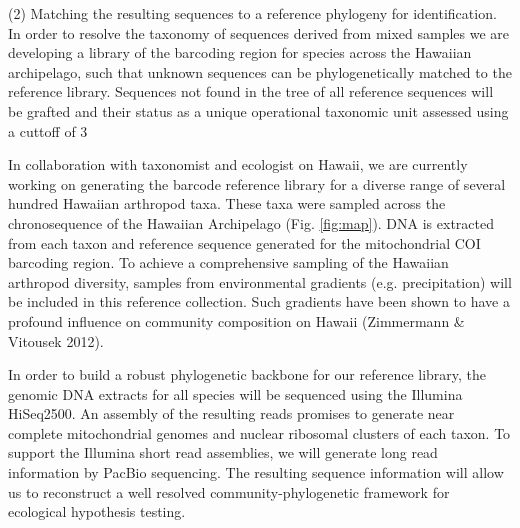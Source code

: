 \documentclass[11pt]{article}
\makeatletter
\renewcommand{\paragraph}{\@startsection{paragraph}{4}{\z@}
  {1ex \@plus 1ex \@minus .2ex}{-1em}
  {\normalfont\normalsize\it}
}
\makeatother
\begin{document}
\paragraph{(2) Matching the resulting sequences to a reference phylogeny for identification.}
In order to resolve the taxonomy of sequences derived from mixed samples we are developing a library of the barcoding region for species across the Hawaiian archipelago, such that unknown sequences can be phylogenetically matched \citep{} to the reference library.  Sequences not found in the tree of all reference sequences will be grafted and their status as a unique operational taxonomic unit assessed using a cuttoff of 3%

In collaboration with taxonomist and ecologist on Hawaii, we are currently working on generating the barcode reference library for a diverse range of several hundred Hawaiian arthropod taxa. These taxa were sampled across the chronosequence of the Hawaiian Archipelago (Fig. \ref{fig:map}). DNA is extracted from each taxon and reference sequence generated for the mitochondrial COI barcoding region. To achieve a comprehensive sampling of the Hawaiian arthropod diversity, samples from environmental gradients (e.g. precipitation) will be included in this reference collection. Such gradients have been shown to have a profound influence on community composition on Hawaii (Zimmermann & Vitousek 2012).

In order to build a robust phylogenetic backbone for our reference library, the genomic DNA extracts for all species will be sequenced using the Illumina HiSeq2500. An assembly of the resulting reads promises to generate near complete mitochondrial genomes and nuclear ribosomal clusters of each taxon. To support the Illumina short read assemblies, we will generate long read information by PacBio sequencing. The resulting sequence information will allow us to reconstruct a well resolved community-phylogenetic framework for ecological hypothesis testing.
\end{document}

